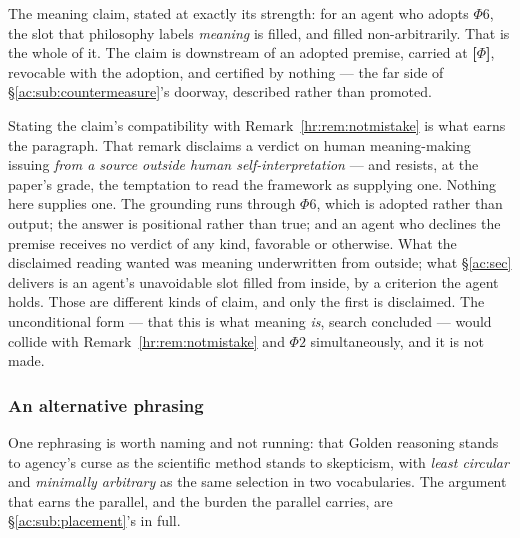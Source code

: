 \documentclass[11pt]{article}
\numberwithin{equation}{section}
\theoremstyle{plain}
\theoremstyle{definition}
\theoremstyle{remark}
\begin{document}
The meaning claim, stated at exactly its strength: for an agent who adopts $\Phi6$, the slot that philosophy labels \emph{meaning} is filled, and filled non-arbitrarily. That is the whole of it. The claim is downstream of an adopted premise, carried at \textbf{[$\Phi$]}, revocable with the adoption, and certified by nothing --- the far side of \S\ref{ac:sub:countermeasure}'s doorway, described rather than promoted.

Stating the claim's compatibility with Remark~\ref{hr:rem:notmistake} is what earns the paragraph. That remark disclaims a verdict on human meaning-making issuing \emph{from a source outside human self-interpretation} --- and resists, at the paper's grade, the temptation to read the framework as supplying one. Nothing here supplies one. The grounding runs through $\Phi6$, which is adopted rather than output; the answer is positional rather than true; and an agent who declines the premise receives no verdict of any kind, favorable or otherwise. What the disclaimed reading wanted was meaning underwritten from outside; what \S\ref{ac:sec} delivers is an agent's unavoidable slot filled from inside, by a criterion the agent holds. Those are different kinds of claim, and only the first is disclaimed. The unconditional form --- that this is what meaning \emph{is}, search concluded --- would collide with Remark~\ref{hr:rem:notmistake} and $\Phi2$ simultaneously, and it is not made.

\subsubsection{An alternative phrasing}\label{ac:ssub:phrasing}

One rephrasing is worth naming and not running: that Golden reasoning stands to agency's curse as the scientific method stands to skepticism, with \emph{least circular} and \emph{minimally arbitrary} as the same selection in two vocabularies. The argument that earns the parallel, and the burden the parallel carries, are \S\ref{ac:sub:placement}'s in full.

%
%
\end{document}
